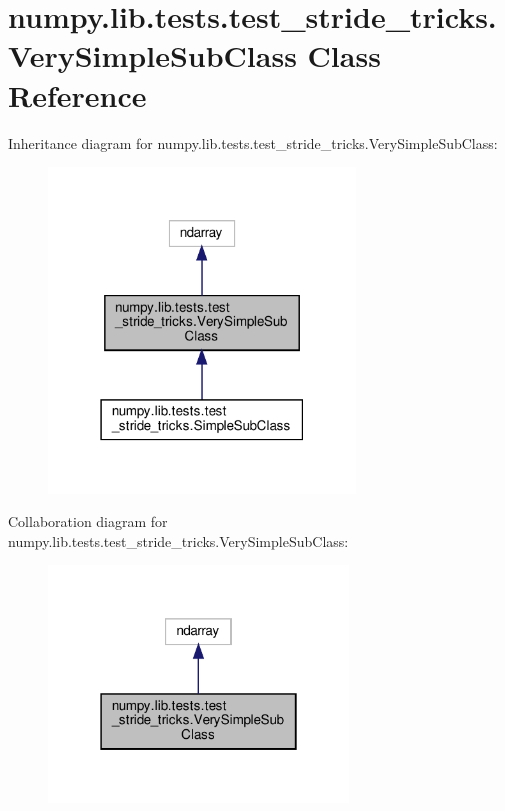 \hypertarget{classnumpy_1_1lib_1_1tests_1_1test__stride__tricks_1_1VerySimpleSubClass}{}\section{numpy.\+lib.\+tests.\+test\+\_\+stride\+\_\+tricks.\+Very\+Simple\+Sub\+Class Class Reference}
\label{classnumpy_1_1lib_1_1tests_1_1test__stride__tricks_1_1VerySimpleSubClass}


Inheritance diagram for numpy.\+lib.\+tests.\+test\+\_\+stride\+\_\+tricks.\+Very\+Simple\+Sub\+Class\+:
\nopagebreak
\begin{figure}[H]
\begin{center}
\leavevmode
\includegraphics[width=231pt]{classnumpy_1_1lib_1_1tests_1_1test__stride__tricks_1_1VerySimpleSubClass__inherit__graph}
\end{center}
\end{figure}


Collaboration diagram for numpy.\+lib.\+tests.\+test\+\_\+stride\+\_\+tricks.\+Very\+Simple\+Sub\+Class\+:
\nopagebreak
\begin{figure}[H]
\begin{center}
\leavevmode
\includegraphics[width=226pt]{classnumpy_1_1lib_1_1tests_1_1test__stride__tricks_1_1VerySimpleSubClass__coll__graph}
\end{center}
\end{figure}
